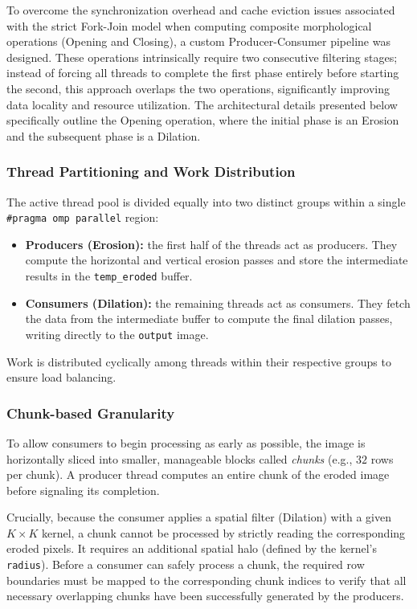 \documentclass[10pt,twocolumn,letterpaper]{article}
\begin{document}
To overcome the synchronization overhead and cache eviction issues associated with the strict Fork-Join model when computing composite morphological operations (Opening and Closing), a custom Producer-Consumer pipeline was designed. These operations intrinsically require two consecutive filtering stages; instead of forcing all threads to complete the first phase entirely before starting the second, this approach overlaps the two operations, significantly improving data locality and resource utilization. The architectural details presented below specifically outline the Opening operation, where the initial phase is an Erosion and the subsequent phase is a Dilation.

\subsubsection{Thread Partitioning and Work Distribution}
The active thread pool is divided equally into two distinct groups within a single \lstinline|#pragma omp parallel| region:
\begin{itemize}
    \item \textbf{Producers (Erosion):} the first half of the threads act as producers. They compute the horizontal and vertical erosion passes and store the intermediate results in the \lstinline|temp_eroded| buffer.
    \item \textbf{Consumers (Dilation):} the remaining threads act as consumers. They fetch the data from the intermediate buffer to compute the final dilation passes, writing directly to the \lstinline|output| image.
\end{itemize}
Work is distributed cyclically among threads within their respective groups to ensure load balancing.

\subsubsection{Chunk-based Granularity}
To allow consumers to begin processing as early as possible, the image is horizontally sliced into smaller, manageable blocks called \textit{chunks} (e.g., $32$ rows per chunk). A producer thread computes an entire chunk of the eroded image before signaling its completion. 

Crucially, because the consumer applies a spatial filter (Dilation) with a given $K \times K$ kernel, a chunk cannot be processed by strictly reading the corresponding eroded pixels. It requires an additional spatial halo (defined by the kernel's \lstinline|radius|). Before a consumer can safely process a chunk, the required row boundaries must be mapped to the corresponding chunk indices to verify that all necessary overlapping chunks have been successfully generated by the producers.
\end{document}
